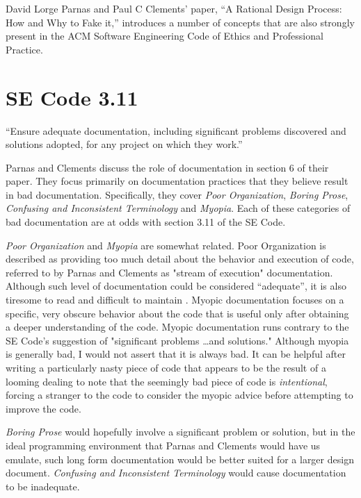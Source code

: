 \documentclass[11pt]{article}
\begin{document}
David Lorge Parnas and Paul C Clements' paper, ``A Rational Design Process: How and Why to Fake it,'' introduces a number of concepts that are also strongly present in the ACM Software Engineering Code of Ethics and Professional Practice.

\section{SE Code 3.11}
``Ensure adequate documentation, including significant problems discovered and solutions adopted, for any project on which they work.'' \cite{secode}

Parnas and Clements discuss the role of documentation in section 6 of their paper.  They focus primarily on documentation practices that they believe result in bad documentation.  Specifically, they cover \emph{Poor Organization}, \emph{Boring Prose}, \emph{Confusing and Inconsistent Terminology} and \emph{Myopia}.  Each of these categories of bad documentation are at odds with section 3.11 of the SE Code.  

\emph{Poor Organization} and \emph{Myopia} are somewhat related.  Poor Organization is described as providing too much detail about the behavior and execution of code, referred to by Parnas and Clements as "stream of execution" documentation.  Although such level of documentation could be considered ``adequate'', it is also tiresome to read and difficult to maintain \cite{fakeit}.  Myopic documentation focuses on a specific, very obscure behavior about the code that is useful only after obtaining a deeper understanding of the code.  Myopic documentation runs contrary to the SE Code's suggestion of "significant problems \ldots and solutions."  Although myopia is generally bad, I would not assert that it is always bad.  It can be helpful after writing a particularly nasty piece of code that appears to be the result of a looming dealing to note that the seemingly bad piece of code is \emph{intentional}, forcing a stranger to the code to consider the myopic advice before attempting to improve the code.

\emph{Boring Prose} would hopefully involve a significant problem or solution, but in the ideal programming environment that Parnas and Clements would have us emulate, such long form documentation would be better suited for a larger design document. \emph{Confusing and Inconsistent Terminology} would cause documentation to be inadequate.
\end{document}
